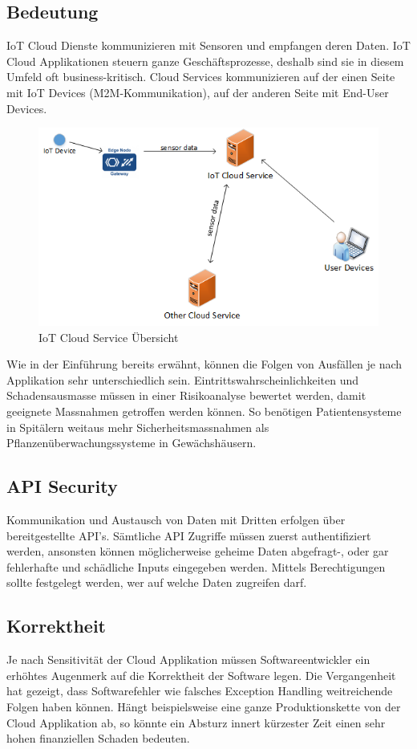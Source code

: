 \subsection{Bedeutung}
IoT Cloud Dienste kommunizieren mit Sensoren und empfangen deren Daten. IoT Cloud Applikationen steuern ganze Geschäftsprozesse, deshalb sind sie in diesem Umfeld oft business-kritisch. Cloud Services kommunizieren auf der einen Seite mit IoT Devices (M2M-Kommunikation), auf der anderen Seite mit End-User Devices.  
\begin{figure}[H]
\centering
\includegraphics[scale=0.8]{../02_Analyse/images/cloudservices.png}
\caption{IoT Cloud Service Übersicht}
\end{figure}

Wie in der Einführung bereits erwähnt, können die Folgen von Ausfällen je nach Applikation sehr unterschiedlich sein. Eintrittswahrscheinlichkeiten und Schadensausmasse müssen in einer Risikoanalyse bewertet werden, damit geeignete Massnahmen getroffen werden können. So benötigen Patientensysteme in Spitälern weitaus mehr Sicherheitsmassnahmen als Pflanzenüberwachungssysteme in Gewächshäusern.

\subsection{API Security}
Kommunikation und Austausch von Daten mit Dritten erfolgen über bereitgestellte API's. Sämtliche API Zugriffe müssen zuerst authentifiziert werden, ansonsten können möglicherweise geheime Daten abgefragt-, oder gar fehlerhafte und schädliche Inputs eingegeben werden. Mittels Berechtigungen sollte festgelegt werden, wer auf welche Daten zugreifen darf.

\subsection{Korrektheit}
Je nach Sensitivität der Cloud Applikation müssen Softwareentwickler ein erhöhtes Augenmerk auf die Korrektheit der Software legen. Die Vergangenheit hat gezeigt, dass Softwarefehler wie falsches Exception Handling weitreichende Folgen haben können. Hängt beispielsweise eine ganze Produktionskette von der Cloud Applikation ab, so könnte ein Absturz innert kürzester Zeit einen sehr hohen finanziellen Schaden bedeuten. 

